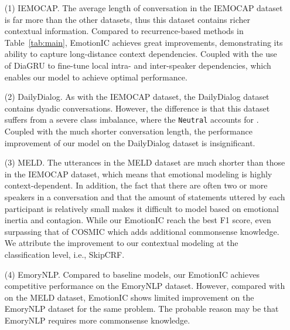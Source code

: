 \documentclass{SCIS2019}
\begin{document}
\begin{itemize}
	\item[(1)] IEMOCAP. The average length of conversation in the IEMOCAP dataset is far more than the other datasets, thus this dataset contains richer contextual information. Compared to recurrence-based methods in Table~\ref{tab:main}, EmotionIC achieves great improvements, demonstrating its ability to capture long-distance context dependencies. Coupled with the use of DiaGRU to fine-tune local intra- and inter-speaker dependencies, which enables our model to achieve optimal performance.
	\item[(2)] DailyDialog. As with the IEMOCAP dataset, the DailyDialog dataset contains dyadic conversations. However, the difference is that this dataset suffers from a severe class imbalance, where the \texttt{Neutral} accounts for . Coupled with the much shorter conversation length, the performance improvement of our model on the DailyDialog dataset is insignificant.
	\item[(3)] MELD. The utterances in the MELD dataset are much shorter than those in the IEMOCAP dataset, which means that emotional modeling is highly context-dependent. In addition, the fact that there are often two or more speakers in a conversation and that the amount of statements uttered by each participant is relatively small makes it difficult to model based on emotional inertia and contagion. While our EmotionIC reach the best F1 score, even surpassing that of COSMIC which adds additional commonsense knowledge. We attribute the improvement to our contextual modeling at the classification level, i.e., SkipCRF.
	\item[(4)] EmoryNLP. Compared to baseline models, our EmotionIC achieves competitive performance on the EmoryNLP dataset. However, compared with on the MELD dataset, EmotionIC shows limited improvement on the EmoryNLP dataset for the same problem. The probable reason may be that EmoryNLP requires more commonsense knowledge.
\end{itemize}
\end{document}
